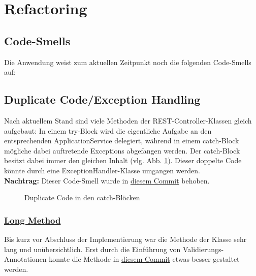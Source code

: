\section{Refactoring}
\subsection{Code-Smells}
Die Anwendung weist zum aktuellen Zeitpunkt noch die folgenden Code-Smells auf:
\subsection*{Duplicate Code/Exception Handling}
Nach aktuellem Stand sind viele Methoden der REST-Controller-Klassen gleich aufgebaut: In einem try-Block wird die eigentliche Aufgabe an den entsprechenden ApplicationService delegiert, während in einem catch-Block mögliche dabei auftretende Exceptions abgefangen werden. Der catch-Block besitzt dabei immer den gleichen Inhalt (vlg. Abb. \ref{fig:dc}). Dieser doppelte Code könnte durch eine ExceptionHandler-Klasse umgangen werden.\\
\textbf{Nachtrag:} Dieser Code-Smell wurde in \href{https://github.com/NI-R0/DH-Software-Engineering-II/commit/44369fb2bfe2282cfb26be4d751847d360065054#diff-89438de53bd19c43d80c2b26cdde6bd6308fa8a8aa7756060b719128f67495b9}{diesem Commit} behoben.

\begin{figure}[!htb]
    \caption[Duplicate Code Section]{Duplicate Code in den catch-Blöcken}
    \label{fig:dc}
\end{figure}


\subsubsection*{\href{https://refactoring.guru/smells/long-method}{Long Method}}
Bis kurz vor Abschluss der Implementierung war die Methode  der Klasse  sehr lang und unübersichtlich. Erst durch die Einführung von Validierungs-Annotationen konnte die Methode in \href{"https://github.com/NI-R0/DH-Software-Engineering-II/commit/1d66a085892b8a36745535f6b7fb183f71d174cd#diff-b90e0d056d7cd0a8a87470a450267e7e4cd1adc99b768975286ad0443fe57ff8"}{diesem Commit} etwas besser gestaltet werden.

